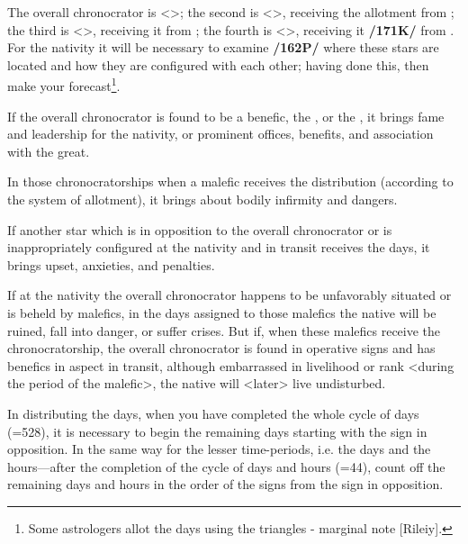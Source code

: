 The overall chronocrator is \Jupiter\xspace <\Pisces>; the second is \Mercury\xspace <\Gemini>, receiving the allotment from \Jupiter; the third is \Mars <\Scorpio>, receiving it from \Mercury; the fourth is \Venus <\Taurus>, receiving it \textbf{/171K/} from \Mars. For the nativity it will be necessary to examine \textbf{/162P/} where these stars are located and how they are configured with each other; having done this, then make your forecast\footnote{Some astrologers allot the days using the triangles - marginal note [Rileiy].}.

If the overall chronocrator is found to be a benefic, the \Sun, or the \Moon, it brings fame and leadership for the nativity, or prominent offices, benefits, and association with the great. 

In those chronocratorships when a malefic receives the distribution (according to the system of allotment), it brings about bodily infirmity and dangers. 

If another star which is in opposition to the overall chronocrator or is inappropriately configured at the nativity and in transit receives the days, it brings upset, anxieties, and penalties. 

If at the nativity the overall chronocrator happens to be unfavorably situated or is beheld by malefics, in the days assigned to those malefics the native will be ruined, fall into danger, or suffer crises. But if, when these malefics receive the chronocratorship, the overall chronocrator is found in operative signs and has benefics in aspect in transit, although embarrassed in livelihood or rank <during the period of the malefic>, the native will <later> live undisturbed.

In distributing the days, when you have completed the whole cycle of days (=528), it is necessary to begin the remaining days starting with the sign in opposition. In the same way for the lesser time-periods, i.e. the days and the hours—after the completion of the cycle of days and hours (=44), count off the
remaining days and hours in the order of the signs from the sign in opposition.

\newpage
